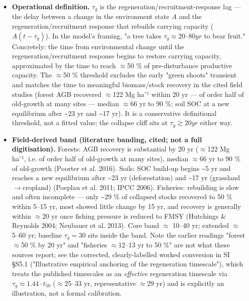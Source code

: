 \documentclass[11pt]{article}
\begin{document}
\begin{itemize}
\item \textbf{Operational definition.} $\tau{}_{g}$ is the regeneration/recruitment-response lag — the delay between a change in the environment state $A$ and the regeneration/recruitment response that rebuilds carrying capacity ($A(t - \tau{}_{g})$). In the model's framing, "a tree takes $\tau{}_{g} \approx{} 20–80 yr$ to bear fruit." Concretely: the time from environmental change until the regeneration/recruitment response begins to restore carrying capacity, approximated by the time to reach \ensuremath{\approx{}}50 \% of pre-disturbance productive capacity. The \ensuremath{\approx{}}50 \% threshold excludes the early "green shoots" transient and matches the time to meaningful biomass/stock recovery in the cited field studies (forest AGB recovered \ensuremath{\approx{}}122 Mg ha⁻¹ within 20 yr — of order half of old-growth at many sites — median \ensuremath{\approx{}}66 yr to 90 \%; soil SOC at a new equilibrium after \~{}23 yr and \~{}17 yr). It is a conservative definitional threshold, not a fitted value; the collapse cliff sits at $\tau{}_{g} \gtrsim{} 20 yr$ either way.
\item \textbf{Field-derived band (literature banding, cited; not a full digitisation).} Forests: AGB recovery is substantial by 20 yr (\ensuremath{\approx{}}122 Mg ha⁻¹, i.e. of order half of old-growth at many sites), median \ensuremath{\approx{}}66 yr to 90 \% of old-growth (Poorter et al. 2016). Soils: SOC build-up begins \~{}5 yr and reaches a new equilibrium after \~{}23 yr (deforestation) and \~{}17 yr (grassland\ensuremath{\to{}}cropland) (Poeplau et al. 2011; IPCC 2006). Fisheries: rebuilding is slow and often incomplete — only \~{}29 \% of collapsed stocks recovered to 50 \% within 5–15 yr, most showed little change by 15 yr, and recovery is generally within \ensuremath{\approx{}}20 yr once fishing pressure is reduced to FMSY (Hutchings \& Reynolds 2004; Neubauer et al. 2013). Core band \ensuremath{\approx{}} 10–40 yr; extended \ensuremath{\approx{}} 5–60 yr; baseline $\tau{}_{g} = 30$ sits inside the band. Note the earlier readings "forest \ensuremath{\approx{}}50 \% by 20 yr" and "fisheries \ensuremath{\approx{}}12–13 yr to 50 \%" are not what these sources report; see the corrected, clearly-labelled worked conversion in SI §S5.1 ("Illustrative empirical anchoring of the regeneration timescale"), which treats the published timescales as an \emph{effective} regeneration timescale via $\tau{}_{g} \approx{} 1.44 \cdot{} t_{50}$ (\ensuremath{\approx{}}25–33 yr, representative \ensuremath{\approx{}}29 yr) and is explicitly an illustration, not a formal calibration.

\end{itemize}
\end{document}
